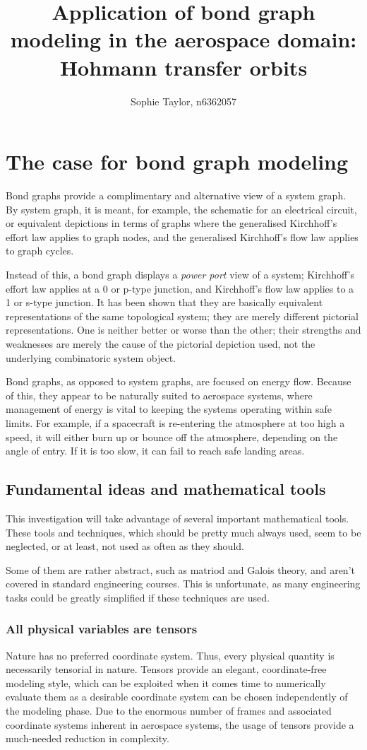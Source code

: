 \documentclass[utf8,a4paper,12pt]{report}
\title{Application of bond graph modeling in the aerospace domain: Hohmann transfer orbits}
\author{Sophie Taylor, n6362057}
\begin{document}
\maketitle
\tableofcontents

\chapter{The case for bond graph modeling}
Bond graphs provide a complimentary and alternative view of a system graph. By system graph, it is meant, for example, the schematic for an electrical circuit, or equivalent depictions in terms of graphs where the generalised Kirchhoff's effort law applies to graph nodes, and the generalised Kirchhoff's flow law applies to graph cycles.

 Instead of this, a bond graph displays a \emph{power port} view of a system; Kirchhoff's effort law applies at a 0 or p-type junction, and Kirchhoff's flow law applies to a 1 or s-type junction. It has been shown that they are basically equivalent representations of the same topological system; they are merely different pictorial representations. One is neither better or worse than the other; their strengths and weaknesses are merely the cause of the pictorial depiction used, not the underlying combinatoric system object.

Bond graphs, as opposed to system graphs, are focused on energy flow. Because of this, they appear to be naturally suited to aerospace systems, where management of energy is vital to keeping the systems operating within safe limits. For example, if a spacecraft is re-entering the atmosphere at too high a speed, it will either burn up or bounce off the atmosphere, depending on the angle of entry. If it is too slow, it can fail to reach safe landing areas.
\section{Fundamental ideas and mathematical tools}
This investigation will take advantage of several important mathematical tools. These tools and techniques, which should be pretty much always used, seem to be neglected, or at least, not used as often as they should.

Some of them are rather abstract, such as matriod and Galois theory, and aren't covered in standard engineering courses. This is unfortunate, as many engineering tasks could be greatly simplified if these techniques are used.
\subsection{All physical variables are tensors}
Nature has no preferred coordinate system. Thus, every physical quantity is necessarily tensorial in nature. Tensors provide an elegant, coordinate-free modeling style, which can be exploited when it comes time to numerically evaluate them as a desirable coordinate system can be chosen independently of the modeling phase. Due to the enormous number of frames and associated coordinate systems inherent in aerospace systems, the usage of tensors provide a much-needed reduction in complexity.
\end{document}
